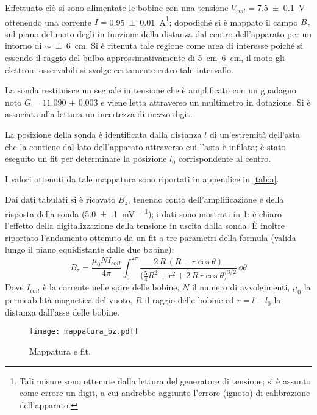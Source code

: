 Effettuato ciò si sono alimentate le bobine con una tensione $V_{coil}=$\SI{7.5 \pm 0.1}{\volt} ottenendo una corrente $I=$\SI{0.95 \pm 0.01}{\ampere}\footnote{Tali misure sono ottenute dalla lettura del generatore di tensione; si è assunto come errore un digit, a cui andrebbe aggiunto l'errore (ignoto) di calibrazione dell'apparato.}; dopodiché si è mappato il campo $B_z$ sul piano del moto degli \e in funzione della distanza dal centro dell'apparato per un intorno di $\sim $\SI{\pm 6}{\cm}.
Si è ritenuta tale regione come area di interesse poiché si essendo il raggio del bulbo approssimativamente di \SIrange{5}{6}{\cm}, il moto gli elettroni osservabili si svolge certamente entro tale intervallo.

La sonda restituisce un segnale in tensione che è amplificato con un guadagno noto $G = \num{11.090(3)}$ e viene letta attraverso un multimetro in dotazione. Si è associata alla lettura un incertezza di mezzo digit.

La posizione della sonda è identificata dalla distanza $l$ di un'estremità dell'asta che la contiene dal lato dell'apparato attraverso cui l'asta è infilata; è stato eseguito un fit per determinare la posizione $l_0$ corrispondente al centro.

I valori ottenuti da tale mappatura sono riportati in appendice in \tablename{ \ref{tab:a}}.

Dai dati tabulati si è ricavato $B_z$, tenendo conto dell'amplificazione e della risposta della sonda (\SI{5.0(1)}{\mV\per\gauss}); i dati sono mostrati in \figurename{ \ref{fig:fit1}}: è chiaro l'effetto della digitalizzazione della tensione in uscita dalla sonda. È inoltre riportato l'andamento ottenuto da un fit a tre parametri della formula (valida lungo il piano equidistante dalle due bobine):
\begin{equation} \label{eq:bz}
		B_z = \frac{\mu_0 N I_{coil}}{4 \pi} \int_0^{2\pi} \frac{2\, R\, (R - r \cos\theta )}{\big(\frac{5}{4} R^2 + r^2 + 2\, R \, r \cos \theta\big) ^ {3/2}} \, \dd \theta
\end{equation}
Dove $I_{coil}$ è la corrente nelle spire delle bobine, $N$ il numero di avvolgimenti, $\mu_0$ la permeabilità magnetica del vuoto, $R$ il raggio delle bobine ed $r = l - l_0$ la distanza dall'asse delle bobine.


\begin{figure}[H]
	\centering
	\texttt{[image: mappatura\_bz.pdf]}
	\caption{Mappatura e fit.}
	\label{fig:fit1}
\end{figure}

